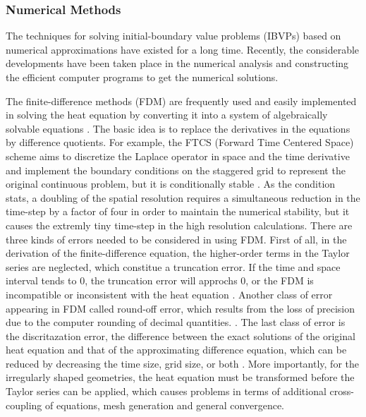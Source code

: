 \subsubsection{Numerical Methods}\label{numerical methods}

The techniques for solving initial-boundary value problems (IBVPs) based on numerical approximations have existed for a long time. Recently, the considerable developments have been taken place in the numerical analysis and constructing the efficient computer programs to get the numerical solutions. 


The finite-difference methods (FDM) are frequently used and easily
implemented in solving the heat equation by converting it into a
system of algebraically solvable equations
\cite{grossmann2007numerical}. The basic idea is to replace the
derivatives in the equations by difference quotients. For example, the
FTCS (Forward Time Centered Space) scheme
\cite{pletcher2012computational} aims to discretize the Laplace
operator in space and the time derivative and implement the boundary
conditions on the staggered grid to represent the original continuous
problem, but it is conditionally stable
\cite{pletcher2012computational}. As the condition stats, a doubling
of the spatial resolution requires a simultaneous reduction in the
time-step by a factor of four in order to maintain the numerical
stability, but it causes the extremly tiny time-step in the high
resolution calculations. There are three kinds of errors needed to be
considered in using FDM. First of all, in the derivation of the
finite-difference equation, the higher-order terms in the Taylor
series are neglected, which constitue a truncation error. If the time
and space interval tends to $0$, the truncation error will approchs
$0$, or the FDM is incompatible or inconsistent with the heat equation
\cite{crank1979mathematics}. Another class of error appearing in FDM
called round-off error, which results from the loss of precision due
to the computer rounding of decimal quantities.
\cite{hoffman2018numerical}. The last class of error is the discritazation
error, the difference between the exact solutions of the original heat
equation and that of the approximating difference equation, which can
be reduced by decreasing the time size, grid size, or both
\cite{crank1979mathematics}. More importantly, for the irregularly shaped geometries, the heat equation must be transformed before the Taylor series can be applied, which causes problems in terms of additional cross-coupling of equations, mesh generation and general convergence.


